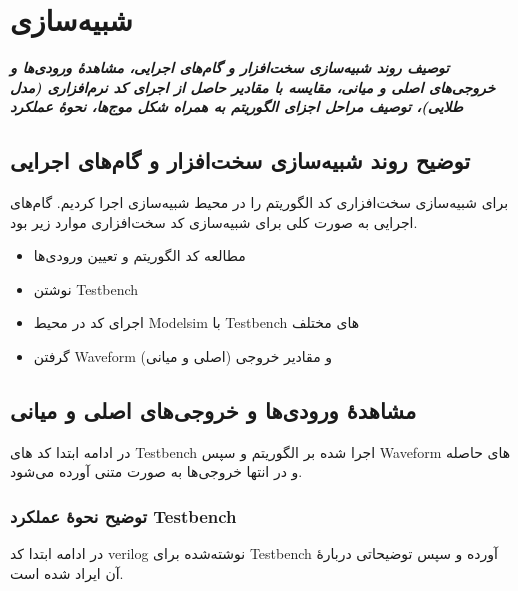 \chapter{شبیه‌سازی}
\noindent
\textbf{
	\textit{
		توصیف روند شبیه‌سازی سخت‌افزار و گام‌های اجرایی، مشاهدهٔ ورودی‌ها و خروجی‌های اصلی و میانی، مقایسه با مقادیر حاصل از اجرای کد نرم‌افزاری (مدل طلایی)، توصیف مراحل اجزای الگوریتم به همراه شکل موج‌ها، نحوهٔ عملکرد 
	}
}
\pagebreak

\section{توضیح روند شبیه‌سازی سخت‌افزار و گام‌های اجرایی}
برای شبیه‌سازی سخت‌افزاری کد 
الگوریتم 
را در محیط شبیه‌سازی 
اجرا کردیم. گام‌های اجرایی به صورت کلی برای شبیه‌سازی کد سخت‌افزاری موارد زیر بود. 
\begin{itemize}
	\item
	      مطالعه کد الگوریتم و تعیین ورودی‌ها
	\item
	      نوشتن Testbench
	\item
	      اجرای کد در محیط Modelsim با Testbench های مختلف
	\item
	      گرفتن Waveform و مقادیر خروجی (اصلی و میانی)
\end{itemize}
\section{مشاهدهٔ ورودی‌ها و خروجی‌های اصلی و میانی}
در ادامه ابتدا کد های Testbench اجرا شده بر الگوریتم و سپس Waveform
های حاصله و در انتها خروجی‌ها به صورت متنی آورده می‌شود.

\subsection{توضیح نحوهٔ عملکرد Testbench}
در ادامه ابتدا کد verilog نوشته‌شده برای  Testbench آورده  و سپس توضیحاتی دربارهٔ آن ایراد شده است. 
\pagebreak
\subsubsection{}


